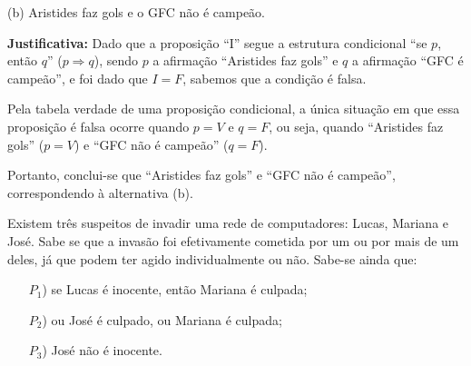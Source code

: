 \documentclass[12pt, a4paper, onecolumn]{exam}
\begin{document}
\begin{questions}

    \begin{solution}
        (b) Aristides faz gols e o GFC não é campeão.
        
        \textbf{Justificativa:}
            Dado que a proposição “I” segue a estrutura condicional “se \(p\), então \(q\)” (\( p \Rightarrow q \)), sendo \( p \) a afirmação “Aristides faz gols” e \( q \) a afirmação “GFC é campeão”, e foi dado que \( I = F \), sabemos que a condição é falsa.
            
            Pela tabela verdade de uma proposição condicional, a única situação em que essa proposição é falsa ocorre quando \( p = V \) e \( q = F \), ou seja, quando “Aristides faz gols” (\( p = V \)) e “GFC não é campeão” (\( q = F \)).
            
            Portanto, conclui-se que “Aristides faz gols” e “GFC não é campeão”, correspondendo à alternativa (b).
    \end{solution}

    \pagebreak
    
    \question[q8] Existem três suspeitos de invadir uma rede de computadores: Lucas, Mariana e José. Sabe se que a invasão foi efetivamente cometida por um ou por mais de um deles, já que podem ter agido individualmente ou não. Sabe-se ainda que:
        
        \begin{enumerate}
            \item[\(P_1\))] se Lucas é inocente, então Mariana é culpada;
            \item[\(P_2\))] ou José é culpado, ou Mariana é culpada;
            \item[\(P_3\))] José não é inocente.
        \end{enumerate}
        

\end{questions}
\end{document}
